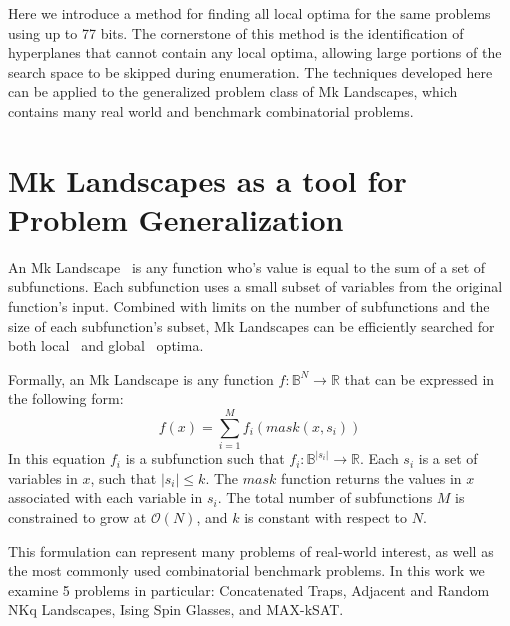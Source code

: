 \documentclass[runningheads,a4paper]{llncs}
\newcommand{\BigO}[1]{$\mathcal{O}{(#1)}$}
\begin{document}
Here we introduce a method for finding all local optima for the same problems using
up to 77 bits. The cornerstone of this method is the identification
of hyperplanes that cannot contain any local optima, allowing large
portions of the search space to be skipped during enumeration.
The techniques developed here can be applied to the generalized problem class of Mk Landscapes,
which contains many real world and benchmark combinatorial problems.



\section{Mk Landscapes as a tool for Problem Generalization}
\label{sec-mk}
An Mk Landscape~\cite{whitley:2015:mk} is any function
who's value is equal to the sum of a set of subfunctions.
Each subfunction uses a small subset of variables from the original function's input.
Combined with limits on the number of subfunctions and the size of each subfunction's
subset, Mk Landscapes can be efficiently searched for both local~\cite{whitley:2012:constant,chicano:2014:ball}
and global~\cite{goldman:2015:GBO,tintos:2015:partitioncross} optima.

Formally, an Mk Landscape is any function $f : \mathbb{B}^{N}\rightarrow \mathbb{R}$
that can be expressed in the following form:
\begin{equation}
  f(x) = \sum_{i=1}^{M} f_i(mask(x, s_i))
  \label{eq-mk}
\end{equation}
In this equation $f_i$ is a subfunction such that $f_i : \mathbb{B}^{|s_i|}\rightarrow \mathbb{R}$.
Each $s_i$ is a set of variables in $x$, such that $|s_i| \leq k$.
The $mask$ function
returns the values in $x$ associated with each variable in $s_i$.
The total number of subfunctions $M$ is constrained to grow at \BigO{N}, and $k$
is constant with respect to $N$.

This formulation can represent many problems of real-world interest, as well as
the most commonly used combinatorial benchmark problems. In this work we
examine 5 problems in particular: Concatenated Traps, Adjacent and Random NKq Landscapes,
Ising Spin Glasses, and MAX-kSAT.
\end{document}
